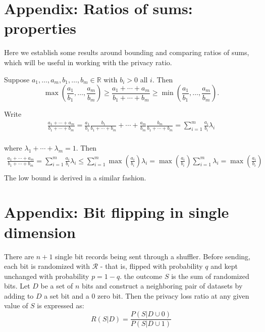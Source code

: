 \documentclass[11pt]{article}
\newcommand{\cR}{\mathcal{R}}
\newcommand{\R}{\mathbb{R}}
\begin{document}

\section{Appendix: Ratios of sums: properties}

Here we establish some results around bounding and comparing ratios of sums, which will be useful in working with the privacy ratio.


\begin{lem} \label{lem:rsbound}
Suppose $a_1,\dots,a_m,b_1,\dots,b_m \in \R$ with $b_i > 0$ all $i$.
Then 
\[ \max\left(\frac{a_1}{b_1},\dots,\frac{a_m}{b_m}\right) \geq  \frac{a_1 + \cdots + a_m}{b_1 + \cdots + b_m} \geq \min \left(\frac{a_1}{b_1},\dots,\frac{a_m}{b_m}\right). \]
\end{lem}
\begin{pf}
Write
 \begin{align*}
  \frac{a_1 + \cdots + a_m}{b_1 + \cdots + b_m}
= \frac{a_1}{b_1}\frac{b_1}{b_1+\cdots+b_m} +
\cdots + \frac{a_m}{b_m}\frac{b_m}{b_1+\cdots+b_m} = \sum_{i=1}^m \frac{a_i}{b_i} \lambda_i  \\ 
\end{align*}

where $\lambda_1 + \cdots + \lambda_m = 1$.  Then
 \begin{align*}
  \frac{a_1 + \cdots + a_m}{b_1 + \cdots + b_m} = \sum_{i=1}^m \frac{a_i}{b_i} \lambda_i  \leq  \sum_{i=1}^m \max \left ( \frac{a_i}{b_i} \right ) \lambda_i  = \max \left ( \frac{a_i}{b_i} \right ) \sum_{i=1}^m \lambda_i = \max \left ( \frac{a_i}{b_i} \right ) \\ 
\end{align*}
The low bound is derived in a similar fashion. 
\end{pf}


\section{Appendix: Bit flipping in single dimension}


There are $n+1$ single bit records being sent through a shuffler.  Before sending, each bit is randomized with $\cR$ - that is, flipped with probability $q$  and kept unchanged with probability $p=1-q$.  the outcome $S$ is the sum of randomized bits. Let $D$ be a set of $n$ bits and construct a neighboring pair of datasets by adding to $D$ a set bit and a 0 zero bit.  Then the privacy loss ratio at any given value of $S$ is expressed as:
\begin{equation} \label{eq:} 
R(S|D)= \frac{P(S|D \cup 0)}{P(S|D \cup 1)}
\end{equation}
\end{document}
